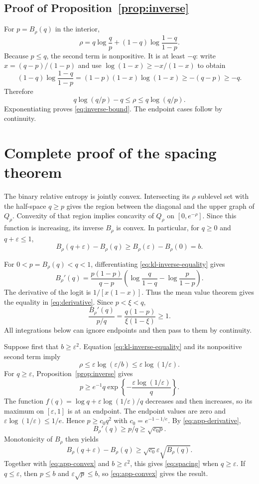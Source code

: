\documentclass{article}
\theoremstyle{remark}
\newcommand{\eps}{\varepsilon}
\begin{document}
\subsection{Proof of Proposition~\ref{prop:inverse}}

For $p=B_\rho(q)$ in the interior,
\begin{equation}
 \rho=q\log\frac qp+(1-q)\log\frac{1-q}{1-p}.
 \label{eq:kl-inverse-equality}
\end{equation}
Because $p\le q$, the second term is nonpositive.  It is at least $-q$:
write $x=(q-p)/(1-p)$ and use
$\log(1-x)\ge-x/(1-x)$ to obtain
\[
 (1-q)\log\frac{1-q}{1-p}
 =(1-p)(1-x)\log(1-x)\ge-(q-p)\ge-q.
\]
Therefore
\[
 q\log(q/p)-q\le\rho\le q\log(q/p).
\]
Exponentiating proves \eqref{eq:inverse-bound}.  The endpoint cases follow by
continuity.

\section{Complete proof of the spacing theorem}
\label{app:geometry}

The binary relative entropy is jointly convex.  Intersecting its $\rho$
sublevel set with the half-space $q\ge p$ gives the region between the
diagonal and the upper graph of $Q_\rho$.  Convexity of that region implies
concavity of $Q_\rho$ on $[0,e^{-\rho}]$.  Since this function is increasing,
its inverse $B_\rho$ is convex.  In particular, for $q\ge0$ and
$q+\eps\le1$,
\begin{equation}
 B_\rho(q+\eps)-B_\rho(q)
 \ge B_\rho(\eps)-B_\rho(0)=b.
 \label{eq:app-convex}
\end{equation}

For $0<p=B_\rho(q)<q<1$, differentiating
\eqref{eq:kl-inverse-equality} gives
\[
 B_\rho'(q)=\frac{p(1-p)}{q-p}
 \left(\log\frac q{1-q}-\log\frac p{1-p}\right).
\]
The derivative of the logit is $1/[x(1-x)]$.  Thus the mean value theorem
gives the equality in \eqref{eq:derivative}.  Since $p<\xi<q$,
\[
 \frac{B_\rho'(q)}{p/q}
 =\frac{q(1-p)}{\xi(1-\xi)}\ge1.
 \label{eq:app-derivative}
\]
All integrations below can ignore endpoints and then pass to them by
continuity.

Suppose first that $b\ge\eps^2$.  Equation
\eqref{eq:kl-inverse-equality} and its nonpositive second term imply
\[
 \rho\le\eps\log(\eps/b)\le\eps\log(1/\eps).
\]
For $q\ge\eps$, Proposition~\ref{prop:inverse} gives
\[
 p\ge e^{-1}q\exp\left\{-\frac{\eps\log(1/\eps)}q\right\}.
\]
The function
$f(q)=\log q+\eps\log(1/\eps)/q$ decreases and then increases, so its maximum
on $[\eps,1]$ is at an endpoint.  The endpoint values are zero and
$\eps\log(1/\eps)\le1/e$.  Hence
$p\ge c_0q^2$ with $c_0=e^{-1-1/e}$.  By
\eqref{eq:app-derivative},
\[
 B_\rho'(q)\ge p/q\ge\sqrt{c_0p}.
\]
Monotonicity of $B_\rho$ then yields
\[
 B_\rho(q+\eps)-B_\rho(q)
 \ge\sqrt{c_0}\eps\sqrt{B_\rho(q)}.
\]
Together with \eqref{eq:app-convex} and $b\ge\eps^2$, this gives
\eqref{eq:spacing} when $q\ge\eps$.  If $q\le\eps$, then $p\le b$ and
$\eps\sqrt p\le b$, so \eqref{eq:app-convex} gives the result.
\end{document}
